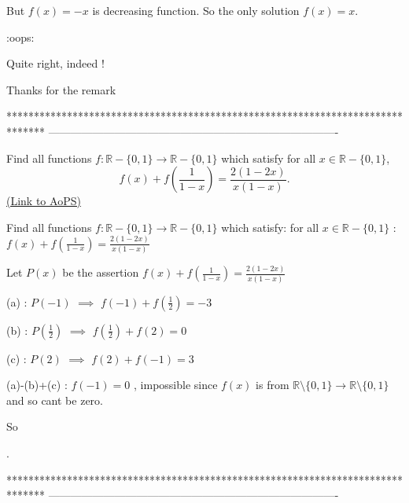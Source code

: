 \begin{solution}
	\begin{tcolorbox}But $ f(x)=-x $ is  decreasing function. So the only solution $ f(x)=x $.\end{tcolorbox}
:oops:

Quite right, indeed !

Thanks for the remark
\end{solution}
*******************************************************************************
-------------------------------------------------------------------------------

\begin{problem}
	Find all functions $f:\mathbb{R}-\{0,1\}\to\mathbb{R}-\{0,1\}$ which satisfy for all $x\in\mathbb{R}-\{0,1\}$,
\[f(x)+f\left(\frac{1}{1-x}\right) = \frac{2(1-2x)}{x(1-x)}.\]
	\flushright \href{https://artofproblemsolving.com/community/c6h446757}{(Link to AoPS)}
\end{problem}



\begin{solution}
	\begin{tcolorbox}Find all functions $f:\mathbb{R}-\{0,1\}\to\mathbb{R}-\{0,1\}$ which satisfy:
for all $x\in\mathbb{R}-\{0,1\}$ : $f(x)+f\left(\frac{1}{1-x}\right) = \frac{2(1-2x)}{x(1-x)}$\end{tcolorbox}
Let $P(x)$ be the assertion $f(x)+f(\frac 1{1-x})=\frac{2(1-2x)}{x(1-x)}$

(a) : $P(-1)$ $\implies$ $f(-1)+f(\frac 12)=-3$

(b) : $P(\frac 12)$ $\implies$ $f(\frac 12)+f(2)=0$

(c) : $P(2)$ $\implies$ $f(2)+f(-1)=3$

(a)-(b)+(c) : $f(-1)=0$ , impossible since $f(x)$ is from $\mathbb R\setminus\{0,1\}\to\mathbb R\setminus\{0,1\}$ and so cant be zero.

So .
\end{solution}
*******************************************************************************
-------------------------------------------------------------------------------

